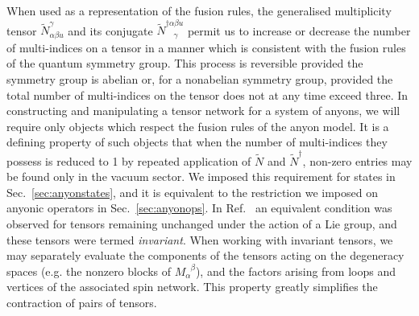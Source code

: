 \documentclass[aps,prb,reprint,superscriptaddress,amsfonts,amsmath,amssymb,showpacs,floatfix]{revtex4-1}
\newcommand{\sref}[1]{Sec.~\ref{#1}}
\newcommand{\rcite}[1]{Ref.~\onlinecite{#1}} %
\begin{document}
When used as a representation of the fusion rules, the generalised multiplicity tensor $\tilde N^\gamma_{\alpha\beta u}$ and its conjugate $\tilde N^{\dagger\alpha\beta u}_{\phantom{\dagger}\gamma}$ permit us to increase or decrease the number of multi-indices on a tensor in a manner which is consistent with the fusion rules of the quantum symmetry group. This process is reversible provided the symmetry group is abelian or, for a nonabelian symmetry group, provided the total number of multi-indices on the tensor does not at any time exceed three.
In constructing and manipulating a tensor network for a system of anyons, we will require only objects which respect the fusion rules of the anyon model. It is a defining property of such objects that when the number of multi-indices they possess is reduced to 1 by repeated application of $\tilde N$ and $\tilde N^\dagger$, non-zero entries may be found only in the vacuum sector. We imposed this requirement for states in \sref{sec:anyonstates}, and it is equivalent to the restriction we imposed on anyonic operators in \sref{sec:anyonops}.
In \rcite{singh2009} an equivalent condition was observed for tensors remaining unchanged under the action of a Lie group, and these tensors were termed \emph{invariant}. When working with invariant tensors, we may separately evaluate the components of the tensors acting on the degeneracy spaces (e.g. the nonzero blocks of $M_\alpha^{\phantom{\alpha}\beta}$), and the factors arising from loops and vertices of the associated spin network. This property greatly simplifies the contraction of pairs of tensors. 
\end{document}
